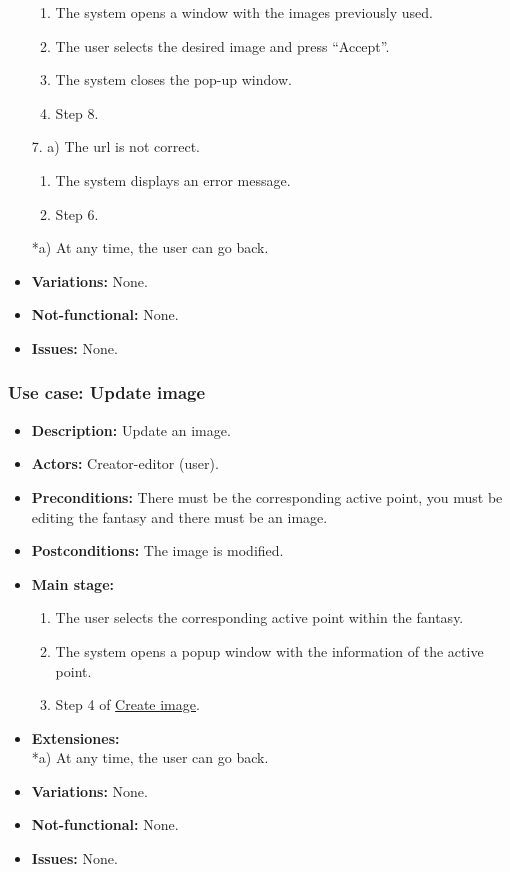 \begin{itemize}
\begin{enumerate}
		\item The system opens a window with the images previously used.
		\item The user selects the desired image and press ``Accept''.
		\item The system closes the pop-up window.
		\item Step 8.
	\end{enumerate}
	7. a) The url is not correct.
	\begin{enumerate}
		\item The system displays an error message.
		\item Step 6.
	\end{enumerate}
	*a) At any time, the user can go back.
	\item \textbf{Variations:} None.
	\item \textbf{Not-functional:} None.
	\item \textbf{Issues:} None. %
\end{itemize}

\subsubsection{Use case: Update image}
\begin{itemize}
	\item \textbf{Description:} Update an image.
	\item \textbf{Actors:} Creator-editor (user).
	\item \textbf{Preconditions:} There must be the corresponding active point, you must be editing the fantasy and there must be an image.
	\item \textbf{Postconditions:} The image is modified.
	\item \textbf{Main stage:}
	\begin{enumerate}
		\item The user selects the corresponding active point within the fantasy.
		\item The system opens a popup window with the information of the active point.
		\item Step 4 of \hyperlink{crearimagen}{Create image}.
	\end{enumerate}
	\item \textbf{Extensiones:} \\ *a) At any time, the user can go back.
	\item \textbf{Variations:} None.
	\item \textbf{Not-functional:} None.
	\item \textbf{Issues:} None.
\end{itemize}

